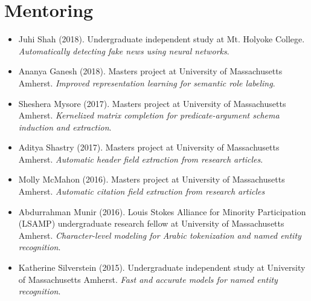 \documentclass{resume}
\begin{document}
\section{Mentoring}
\begin{itemize}
\item Juhi Shah (2018). Undergraduate independent study at Mt. Holyoke College. \emph{Automatically detecting fake news using neural networks}.
\item Ananya Ganesh (2018). Masters project at University of Massachusetts Amherst. \emph{Improved representation learning for semantic role labeling}.
\item Sheshera Mysore (2017). Masters project at University of Massachusetts Amherst. \emph{Kernelized matrix completion for predicate-argument schema induction and extraction}.
\item Aditya Shastry (2017). Masters project at University of Massachusetts Amherst. \emph{Automatic header field extraction from research articles}.
\item Molly McMahon (2016). Masters project at University of Massachusetts Amherst. \emph{Automatic citation field extraction from research articles}
\item Abdurrahman Munir (2016). Louis Stokes Alliance for Minority Participation (LSAMP) undergraduate research fellow at University of Massachusetts Amherst. \emph{Character-level modeling for Arabic tokenization and named entity recognition}.
\item Katherine Silverstein (2015). Undergraduate independent study at University of Massachusetts Amherst. \emph{Fast and accurate models for named entity recognition}.
\end{itemize}
\end{document}
